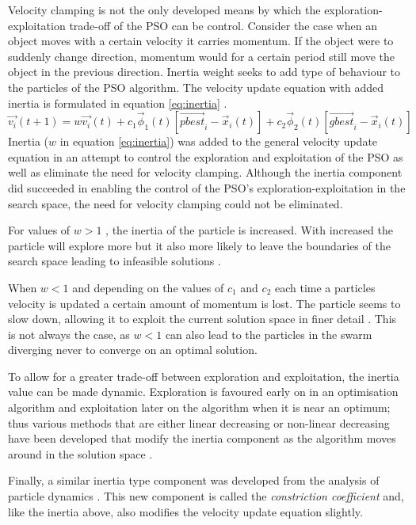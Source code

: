 Velocity clamping is not the only developed means by which  the exploration-exploitation trade-off of the PSO can be control. Consider the case when an object moves with a certain velocity it carries momentum. If the object were to suddenly change direction, momentum would for a certain period still move the object in the previous direction. Inertia weight seeks to add type of behaviour to the particles of the PSO algorithm. The velocity update equation with added inertia is formulated in equation \ref{eq:inertia} \cite{FundamentalSwarm}.
\begin{equation}
\vec{v_i}(t+1) = w\vec{v_i}(t) + c_1\vec{\phi}_1(t)[\vec{pbest}_i - \vec{x}_i(t)] + c_2\vec{\phi}_2(t)[\vec{gbest}_i - \vec{x}_i(t)]\label{eq:inertia}
\end{equation}
Inertia ($w$ in equation \ref{eq:inertia}) was added to the general velocity update equation in an attempt to control the exploration and exploitation of the PSO as well as eliminate the need for velocity clamping\cite{FundamentalSwarm}. Although the inertia component did succeeded in enabling the control of the PSO's exploration-exploitation in the search space, the need for velocity clamping could not be eliminated\cite{FundamentalSwarm}.

For values of $w > 1$ , the inertia of the particle is increased. With increased the particle will explore more but it also more likely to leave the boundaries of the search space leading to infeasible solutions \cite{FundamentalSwarm}. 

When $w < 1$ and depending on the values of $c_1$ and $c_2$ each time a particles velocity is updated a certain amount of momentum is lost. The particle seems to slow down, allowing it to exploit the current solution space in finer detail \cite{FundamentalSwarm}. This is not always the case, as $w < 1$ can also lead to the particles in the swarm diverging never to converge on an optimal solution.

To allow for a greater trade-off between exploration and exploitation, the inertia value can be made dynamic. Exploration is favoured early on in an optimisation algorithm and  exploitation later on the algorithm when it is near an optimum; thus various methods that are either linear decreasing or non-linear decreasing have been developed that modify the inertia component as the algorithm moves around in the solution space \cite{CompuIntelligenceIntro,FundamentalSwarm}.

Finally, a similar inertia type component was developed from the analysis of particle dynamics \cite{FundamentalSwarm}. This new component is called the \emph{constriction coefficient} and, like the inertia above, also modifies the velocity update equation slightly\cite{adaptPSO,FundamentalSwarm,CompuIntelligenceIntro}. 

